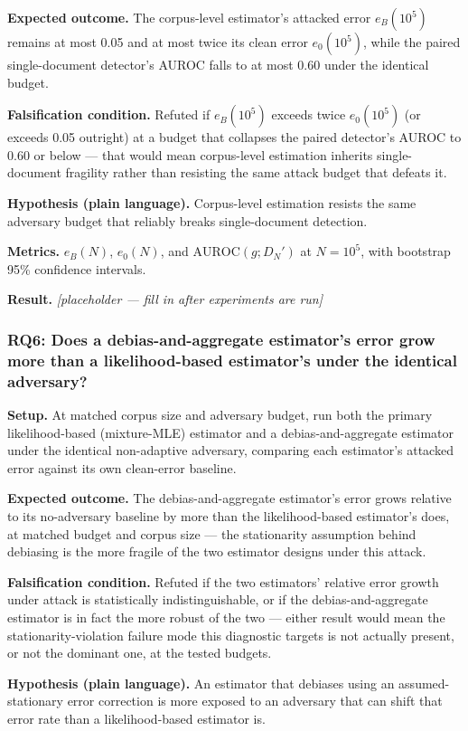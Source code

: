 \documentclass[11pt]{article}
\newcommand{\ph}{\textit{[placeholder --- fill in after experiments are run]}}
\begin{document}
\textbf{Expected outcome.} The corpus-level estimator's attacked error $e_B(10^5)$ remains at most 0.05 and at most twice its clean error $e_0(10^5)$, while the paired single-document detector's AUROC falls to at most 0.60 under the identical budget.

\textbf{Falsification condition.} Refuted if $e_B(10^5)$ exceeds twice $e_0(10^5)$ (or exceeds 0.05 outright) at a budget that collapses the paired detector's AUROC to 0.60 or below --- that would mean corpus-level estimation inherits single-document fragility rather than resisting the same attack budget that defeats it.

\textbf{Hypothesis (plain language).} Corpus-level estimation resists the same adversary budget that reliably breaks single-document detection.

\textbf{Metrics.} $e_B(N)$, $e_0(N)$, and $\mathrm{AUROC}(g; D_N')$ at $N = 10^5$, with bootstrap 95\% confidence intervals.

\textbf{Result.} \ph

\subsubsection{RQ6: Does a debias-and-aggregate estimator's error grow more than a likelihood-based estimator's under the identical adversary?}
\textbf{Setup.} At matched corpus size and adversary budget, run both the primary likelihood-based (mixture-MLE) estimator and a debias-and-aggregate estimator under the identical non-adaptive adversary, comparing each estimator's attacked error against its own clean-error baseline.

\textbf{Expected outcome.} The debias-and-aggregate estimator's error grows relative to its no-adversary baseline by more than the likelihood-based estimator's does, at matched budget and corpus size --- the stationarity assumption behind debiasing is the more fragile of the two estimator designs under this attack.

\textbf{Falsification condition.} Refuted if the two estimators' relative error growth under attack is statistically indistinguishable, or if the debias-and-aggregate estimator is in fact the more robust of the two --- either result would mean the stationarity-violation failure mode this diagnostic targets is not actually present, or not the dominant one, at the tested budgets.

\textbf{Hypothesis (plain language).} An estimator that debiases using an assumed-stationary error correction is more exposed to an adversary that can shift that error rate than a likelihood-based estimator is.
\end{document}
